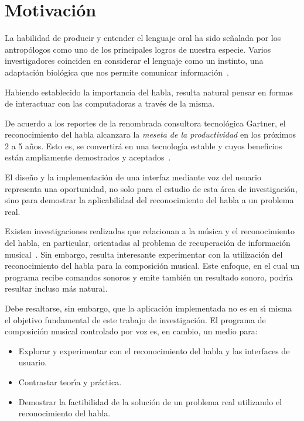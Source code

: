 \section{Motivaci\'on}
\label{sec:motivacion}

La habilidad de producir y entender el lenguaje oral ha sido se\~nalada por los antrop\'ologos
como uno de los principales logros de nuestra especie. Varios investigadores coinciden
en considerar el lenguaje como un instinto, una adaptaci\'on biol\'ogica que nos permite
comunicar \mbox{informaci\'on \cite{GabrielVoice2007}}.

Habiendo establecido la importancia del habla, resulta natural pensar en formas de
interactuar con las computadoras a trav\'es de la misma.

De acuerdo a los reportes de la renombrada consultora tecnol\'ogica Gartner, el reconocimiento
del habla alcanzara la  \emph{meseta de la productividad} en los pr\'oximos 2 a 5 a\~nos. Esto es,
se convertir\'a en una tecnolog{\'\i}a estable y cuyos beneficios est\'an ampliamente demostrados
y \mbox{aceptados \cite{Gartner2012}}.


El dise\~no y la implementaci\'on de una interfaz mediante voz del usuario representa
una oportunidad, no solo para el estudio de esta \'area de investigaci\'on, sino para
demostrar la aplicabilidad del reconocimiento del habla a un problema real.

Existen investigaciones realizadas que relacionan a la m\'usica y el reconocimiento
del habla, en particular, orientadas al problema de recuperaci\'on de informaci\'on
\mbox{musical \cite{Goto2004Speech, Schuller2003Hybrid}}.
Sin embargo, resulta interesante experimentar con la utilizaci\'on del reconocimiento
del habla para la composici\'on musical. Este enfoque, en el cual un programa recibe comandos
sonoros y emite tambi\'en un resultado sonoro, podr{\'\i}a resultar incluso m\'as natural.

Debe resaltarse, sin embargo, que la aplicaci\'on implementada no es en s{\'\i} misma el objetivo
fundamental de este trabajo de investigaci\'on. El programa de composici\'on musical controlado
por voz es, en cambio, un medio para:

\begin{itemize}
	\item Explorar y experimentar con el reconocimiento del habla y las interfaces de usuario.
	\item Contrastar teor{\'\i}a y pr\'actica.
	\item Demostrar la factibilidad de la soluci\'on de un problema real utilizando el
	reconocimiento del habla.
\end{itemize}